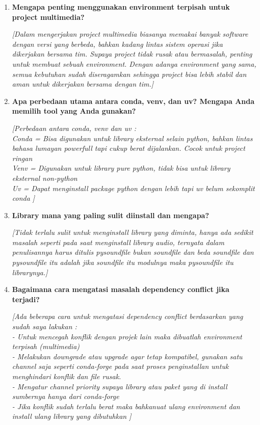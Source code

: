 \documentclass[11pt,a4paper]{article}
\begin{document}
\begin{enumerate}
    \item \textbf{Mengapa penting menggunakan environment terpisah untuk project multimedia?}
    
    \textit{[Dalam mengerjakan project multimedia biasanya  memakai banyak software dengan versi yang berbeda, bahkan kadang lintas sistem operasi jika dikerjakan bersama tim. Supaya project tidak rusak atau bermasalah, penting untuk membuat sebuah environment. Dengan adanya environment yang sama, semua kebutuhan sudah diseragamkan sehingga project bisa lebih stabil dan aman untuk dikerjakan bersama dengan tim.]}
    
    \item \textbf{Apa perbedaan utama antara conda, venv, dan uv? Mengapa Anda memilih tool yang Anda gunakan?}
    
    \textit{[Perbedaan antara conda, venv dan uv : \\
Conda = Bisa digunakan untuk library eksternal selain python, bahkan lintas bahasa lumayan powerfull  tapi cukup berat dijalankan. Cocok untuk project ringan \\
Venv = Digunakan untuk library pure python, tidak bisa untuk library eksternal non-python \\
Uv = Dapat menginstall package python dengan lebih tapi uv belum sekomplit conda
]}
    
    \item \textbf{Library mana yang paling sulit diinstall dan mengapa?}
    
    \textit{[Tidak terlalu sulit untuk menginstall library yang diminta, hanya ada sedikit masalah seperti pada saat menginstall library audio, ternyata dalam penulisannya harus ditulis pysoundfile bukan soundfile dan  beda soundfile dan pysoundfile itu adalah jika soundfile itu modulnya maka pysoundfile itu librarynya.]}
    
    \item \textbf{Bagaimana cara mengatasi masalah dependency conflict jika terjadi?}
    
    \textit{[Ada beberapa cara untuk mengatasi dependency conflict berdasarkan yang sudah saya lakukan : \\
-	Untuk mencegah konflik dengan projek lain maka dibuatlah environment terpisah (multimedia)\\
-	Melakukan downgrade atau upgrade agar tetap kompatibel, gunakan satu channel saja seperti conda-forge pada saat proses penginstallan untuk menghindari konflik dan file rusak. \\
-	Mengatur channel priority supaya library atau paket yang di install sumbernya hanya dari conda-forge \\
-	Jika konflik sudah terlalu berat maka bahkanuat ulang environment dan install ulang library yang dibutuhkan
]}
    

\end{enumerate}
\end{document}

